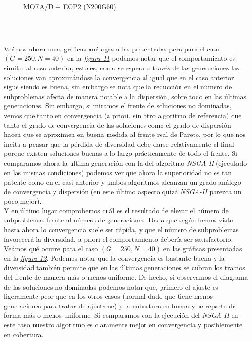 \begin{minipage}[H]{\linewidth}
\begin{minipage}[b]{0.3\linewidth}
\begin{figure}[H]
        \caption{\centering MOEA/D + EOP2 (N200G50)}
        \label{fig:12}
    \end{figure}
    \end{minipage}\\
\end{minipage}\\



Veámos ahora unas gráficas análogas a las presentadas pero para el caso $(G=250, N=40)$ en la \hyperref[fig:11]{\textit{figura 11}} podemos notar que el comportamiento es similar al caso anterior, esto es, como se espera a través de las generaciones las soluciones van aproximándose la convergencia al igual que en el caso anterior sigue siendo es buena, sin embargo se nota que la reducción en el número de subproblemas afecta de manera notable a la dispersión, sobre todo en las últimas generaciones. Sin embargo, si miramos el frente de soluciones no dominadas, vemos que tanto en convergencia (a priori, sin otro algoritmo de referencia) que tanto el grado de convergencia de las soluciones como el grado de dispersión hacen que se aproximen en buena medida al frente real de Pareto, por lo que nos incita a pensar que la pérdida de diversidad debe darse relativamente al final porque existen soluciones buenas a lo largo prácticamente de todo el frente. Si comparamos ahora la última generación con la del algoritmo \textit{NSGA-II} (ejecutado en las mismas condiciones) podemos ver que ahora la superioridad no es tan patente como en el casi anterior y ambos algoritmos alcanzan un grado análogo de convergencia y dispersión (en este último aspecto quizá \textit{NSGA-II} parezca un poco mejor).\\


Y en último lugar comprobemos cuál es el resultado de elevar el número de subproblemas frente al número de generaciones. Dado que según hemos visto hasta ahora lo convergencia suele ser rápida, y que el número de subproblemas favorecerá la diversidad, a priori el comportamiento debería ser satisfactorio. Veámos qué ocurre para el caso $(G=250, N=40)$ en las gráficas presentadas en la \hyperref[fig:12]{\textit{figura 12}}. Podemos notar que la convergencia es bastante buena y la diversidad también permite que en las últimas generaciones se cubran los tramos del frente de manera más o menos uniforme. De hecho, si observamos el diagrama de las soluciones no dominadas podemos notar que, primero el ajuste es ligeramente peor que en los otros casos (normal dado que tiene menos generaciones para tratar de ajustarse) y la cobertura es buena y se reparte de forma más o menos uniforme. Si comparamos con la ejecución del \textit{NSGA-II} en este caso nuestro algoritmo es claramente mejor en convergencia y posiblemente en cobertura. \\

